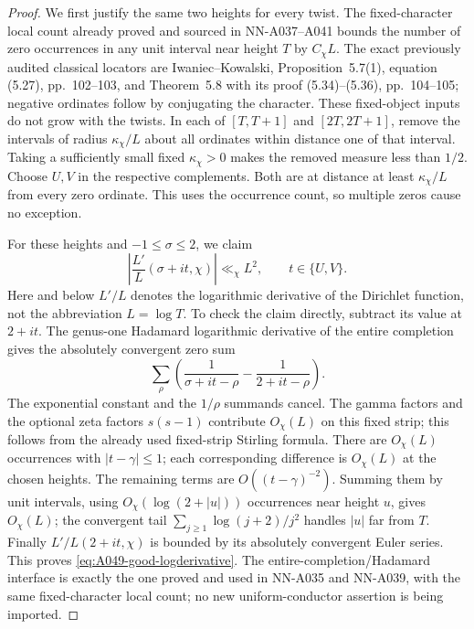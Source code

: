 \begin{proof}
We first justify the same two heights for every twist.
The fixed-character local count already proved and sourced in
NN-A037--A041 bounds the number of zero occurrences in any unit
interval near height \(T\) by \(C_\chi L\).
The exact previously audited classical locators are
Iwaniec--Kowalski, Proposition~5.7(1), equation (5.27),
pp.\ 102--103, and Theorem~5.8 with its proof (5.34)--(5.36),
pp.\ 104--105; negative ordinates follow by conjugating the
character. These fixed-object inputs do not grow with the twists.
In each of \([T,T+1]\) and \([2T,2T+1]\), remove the intervals
of radius \(\kappa_\chi/L\) about all ordinates within distance
one of that interval. Taking a sufficiently small fixed
\(\kappa_\chi>0\) makes the removed measure less than \(1/2\).
Choose \(U,V\) in the respective complements. Both are at
distance at least \(\kappa_\chi/L\) from every zero ordinate.
This uses the occurrence count, so multiple zeros cause no
exception.

For these heights and \(-1\le\sigma\le2\), we claim
\begin{equation}\label{eq:A049-good-logderivative}
 \left|\frac{L'}{L}(\sigma+it,\chi)\right|\ll_\chi L^2,
                              \qquad t\in\{U,V\}.
\end{equation}
Here and below \(L'/L\) denotes the logarithmic derivative of
the Dirichlet function, not the abbreviation \(L=\log T\).
To check the claim directly, subtract its value at \(2+it\).
The genus-one Hadamard logarithmic derivative of the entire
completion gives the absolutely convergent zero sum
\[
 \sum_\rho\left(\frac1{\sigma+it-\rho}
                         -\frac1{2+it-\rho}\right).
\]
The exponential constant and the \(1/\rho\) summands cancel.
The gamma factors and the optional zeta factors \(s(s-1)\)
contribute \(O_\chi(L)\) on this fixed strip; this follows
from the already used fixed-strip Stirling formula.
There are \(O_\chi(L)\) occurrences with \(|t-\gamma|\le1\);
each corresponding difference is \(O_\chi(L)\) at the
chosen heights. The remaining terms are
\(O((t-\gamma)^{-2})\). Summing them by unit intervals,
using \(O_\chi(\log(2+|u|))\) occurrences near height \(u\),
gives \(O_\chi(L)\); the convergent tail
\(\sum_{j\ge1}\log(j+2)/j^2\) handles \(|u|\) far from \(T\).
Finally \(L'/L(2+it,\chi)\) is bounded by its absolutely
convergent Euler series. This proves
\eqref{eq:A049-good-logderivative}.
The entire-completion/Hadamard interface is exactly the one
proved and used in NN-A035 and NN-A039, with the same
fixed-character local count; no new uniform-conductor
assertion is being imported.


\end{proof}
